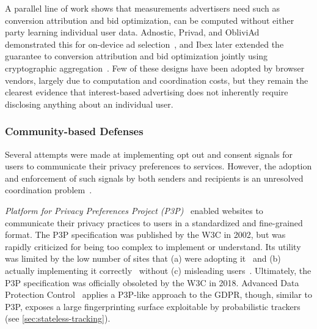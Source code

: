%
A parallel line of work shows that measurements advertisers need such as conversion attribution and bid optimization, can be computed without either party learning individual user data.
%
Adnostic, Privad, and ObliviAd demonstrated this for on-device ad selection~\cite{toubianaAdnosticPrivacyPreserving2010,guhaPrivadPracticalPrivacy2011,backesObliviAdProvablySecure2012}, and Ibex later extended the guarantee to conversion attribution and bid optimization jointly using cryptographic aggregation~\cite{zhongIbexPrivacypreservingAd2022}.
%
Few of these designs have been adopted by browser vendors, largely due to computation and coordination costs, but they remain the clearest evidence that interest-based advertising does not inherently require disclosing anything about an individual user.


\subsubsection{Community-based Defenses}
\label{sec:mixed-defenses-community}


%
Several attempts were made at implementing opt out and consent signals for users to communicate their privacy preferences to services. However, the adoption and enforcement of such signals by both senders and recipients is an unresolved coordination problem~\cite{hilsPrivacyPreferenceSignals2021}.

\noindent
\textit{Platform for Privacy Preferences Project (P3P)}~\cite{reaglePlatformPrivacyPreferences1999,cranorPlatformPrivacyPreferences2002,byersSearchingPrivacyDesign2005,cranorPlatformPrivacyPreferences2006} enabled websites to communicate their privacy practices to users in a standardized and fine-grained format.
%
The P3P specification was published by the W3C in 2002, but was rapidly criticized for being too complex to implement or understand.
%
Its utility was limited by the low number of sites that (a) were adopting it~\cite{cranorUseP3PUser2002} and (b) actually implementing it correctly~\cite{cranorAnalysisP3PDeployment2003} without (c) misleading users~\cite{leonTokenAttemptMisrepresentation2010}.
%
Ultimately, the P3P specification was officially obsoleted by the W3C in 2018.
%
Advanced Data Protection Control~\cite{sustainablecomputinglabAdvancedDataProtection2022} applies a P3P-like approach to the GDPR, though, similar to P3P, exposes a large fingerprinting surface exploitable by probabilistic trackers (see \autoref{sec:stateless-tracking}).

